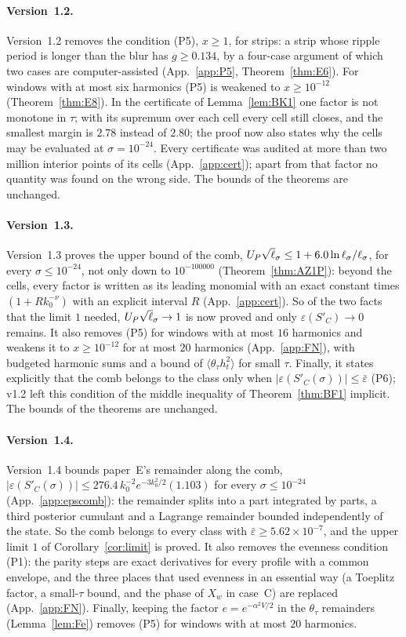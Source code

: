 \paragraph*{Version~1.2.}
Version~1.2 removes the condition (P5), $x\ge1$, for strips: a strip whose ripple period is longer than the blur has $g\ge0.134$, by a four-case
argument of which two cases are computer-assisted (App.~\ref{app:P5}, Theorem~\ref{thm:E6}). For windows with at most six harmonics (P5) is weakened to
$x\ge10^{-12}$ (Theorem~\ref{thm:E8}). In the certificate of Lemma~\ref{lem:BK1} one factor is not monotone in $\tau$; with its supremum over each cell
every cell still closes, and the smallest margin is $2.78$ instead of $2.80$; the proof now also states why the cells may be evaluated at $\sigma=10^{-24}$.
Every certificate was audited at more than two million interior points of its cells (App.~\ref{app:cert}); apart from that factor no quantity was
found on the wrong side. The bounds of the theorems are unchanged.

\paragraph*{Version~1.3.}
Version~1.3 proves the upper bound of the comb, $U_P\sqrt\ls\le1+6.0\ln\ls/\ls$, for every $\sigma\le10^{-24}$, not only down to $10^{-100000}$
(Theorem~\ref{thm:AZ1P}): beyond the cells, every factor is written as its leading monomial with an exact constant times $(1+Rk_0^{-\nu})$ with an explicit
interval $R$ (App.~\ref{app:cert}). So of the two facts that the limit $1$ needed, $U_P\sqrt\ls\to1$ is now proved and only $\varepsilon(S'_C)\to0$ remains.
It also removes (P5) for windows with at most $16$ harmonics and weakens it to $x\ge10^{-12}$ for at most $20$ harmonics (App.~\ref{app:FN}), with
budgeted harmonic sums and a bound of $\langle\theta_\tau h_t^2\rangle$ for small $\tau$. Finally, it states explicitly that the comb belongs to the class only when $|\varepsilon(S'_C(\sigma))|\le\bar\varepsilon$ (P6); v1.2 left this condition of the middle inequality of Theorem~\ref{thm:BF1} implicit. The bounds of the theorems are unchanged.

\paragraph*{Version~1.4.}
Version~1.4 bounds paper~E's remainder along the comb, $|\varepsilon(S'_C(\sigma))|\le276.4\,k_0^{-2}e^{-3k_0^2/2}(1.103)$ for every $\sigma\le10^{-24}$
(App.~\ref{app:epscomb}): the remainder splits into a part integrated by parts, a third posterior cumulant and a Lagrange remainder bounded independently of the state.
So the comb belongs to every class with $\bar\varepsilon\ge5.62\times10^{-7}$, and the upper limit $1$ of Corollary~\ref{cor:limit} is proved. It also removes the
evenness condition (P1): the parity steps are exact derivatives for every profile with a common envelope, and the three places that used evenness
in an essential way (a Toeplitz factor, a small-$\tau$ bound, and the phase of $X_w$ in case~C) are replaced (App.~\ref{app:FN}). Finally, keeping the
factor $e=e^{-\alpha^2V/2}$ in the $\theta_\tau$ remainders (Lemma~\ref{lem:Fe}) removes (P5) for windows with at most $20$ harmonics.

